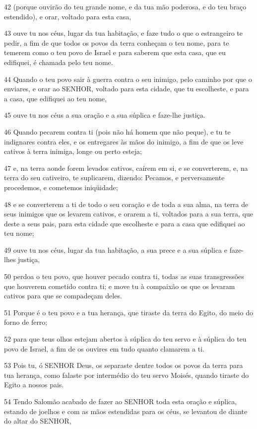 \par 42 (porque ouvirão do teu grande nome, e da tua mão poderosa, e do teu braço estendido), e orar, voltado para esta casa,
\par 43 ouve tu nos céus, lugar da tua habitação, e faze tudo o que o estrangeiro te pedir, a fim de que todos os povos da terra conheçam o teu nome, para te temerem como o teu povo de Israel e para saberem que esta casa, que eu edifiquei, é chamada pelo teu nome.
\par 44 Quando o teu povo sair à guerra contra o seu inimigo, pelo caminho por que o enviares, e orar ao SENHOR, voltado para esta cidade, que tu escolheste, e para a casa, que edifiquei ao teu nome,
\par 45 ouve tu nos céus a sua oração e a sua súplica e faze-lhe justiça.
\par 46 Quando pecarem contra ti (pois não há homem que não peque), e tu te indignares contra eles, e os entregares às mãos do inimigo, a fim de que os leve cativos à terra inimiga, longe ou perto esteja;
\par 47 e, na terra aonde forem levados cativos, caírem em si, e se converterem, e, na terra do seu cativeiro, te suplicarem, dizendo: Pecamos, e perversamente procedemos, e cometemos iniqüidade;
\par 48 e se converterem a ti de todo o seu coração e de toda a sua alma, na terra de seus inimigos que os levarem cativos, e orarem a ti, voltados para a sua terra, que deste a seus pais, para esta cidade que escolheste e para a casa que edifiquei ao teu nome;
\par 49 ouve tu nos céus, lugar da tua habitação, a sua prece e a sua súplica e faze-lhes justiça,
\par 50 perdoa o teu povo, que houver pecado contra ti, todas as suas transgressões que houverem cometido contra ti; e move tu à compaixão os que os levaram cativos para que se compadeçam deles.
\par 51 Porque é o teu povo e a tua herança, que tiraste da terra do Egito, do meio do forno de ferro;
\par 52 para que teus olhos estejam abertos à súplica do teu servo e à súplica do teu povo de Israel, a fim de os ouvires em tudo quanto clamarem a ti.
\par 53 Pois tu, ó SENHOR Deus, os separaste dentre todos os povos da terra para tua herança, como falaste por intermédio do teu servo Moisés, quando tiraste do Egito a nossos pais.
\par 54 Tendo Salomão acabado de fazer ao SENHOR toda esta oração e súplica, estando de joelhos e com as mãos estendidas para os céus, se levantou de diante do altar do SENHOR,
